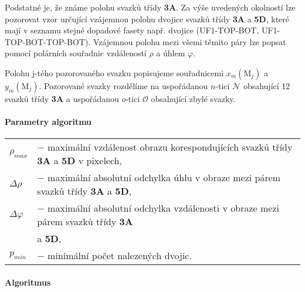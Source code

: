 	Podstatné je, že známe polohu svazků třídy \textbf{3A}. Za výše uvedených okolností lze pozorovat vzor určující vzájemnou polohu dvojice svazků třídy \textbf{3A} a \textbf{5D}, které mají v seznamu stejné dopadové fasety např. dvojice (UF1-TOP-BOT, UF1-TOP-BOT-TOP-BOT). Vzájemnou polohu mezi všemi těmito páry lze popsat pomocí polárních souřadnic vzdáleností $\rho$ a úhlem $\varphi$. 
	
	Polohu j-tého pozorovaného svazku popisujeme souřadnicemi $x_m(\mathrm{M}_j)$ a $y_m(\mathrm{M}_j)$. Pozorované svazky rozdělíme na uspořádanou $n$-tici $\mathcal{N}$ obsahující 12 svazků třídy \textbf{3A} a uspořádanou $o$-tici $\mathcal{O}$ obsahující zbylé svazky. 

\paragraph{Parametry algoritmu}
\hspace{1mm}

	 \begin{tabular}{l L{14cm}}
	 $\rho_{max}$ & $-$ maximální vzdálenost obrazu korespondujících svazků třídy \textbf{3A} a \textbf{5D} v pixelech,\\
	 $\Delta\rho$ & $-$ maximální absolutní odchylka úhlu v obraze mezi párem svazků třídy \textbf{3A} a \textbf{5D},\\
	 $\Delta\varphi$ & $-$ maximální absolutní odchylka vzdálenosti v obraze mezi párem svazků třídy \textbf{3A}\\ &a \textbf{5D},\\
	 $p_{min}$ & $-$ minimální počet nalezených dvojic.\\
	 \end{tabular}

\paragraph{Algoritmus}

